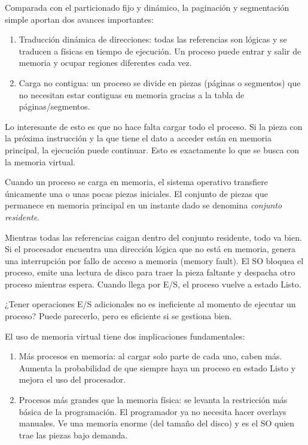 Comparada con el particionado fijo y dinámico, la paginación y segmentación simple aportan dos avances importantes: 
\begin{enumerate}
  \item Traducción dinámica de direcciones: todas las referencias son lógicas y se traducen a físicas en tiempo de ejecución. Un proceso puede entrar y salir de memoria y ocupar regiones diferentes cada vez.
  \item Carga no contigua: un proceso se divide en piezas (páginas o segmentos) que no necesitan estar contiguas en memoria gracias a la tabla de páginas/segmentos.
\end{enumerate}

Lo interesante de esto es que no hace falta cargar todo el proceso. Si la pieza con la próxima instrucción y la que tiene el dato a acceder están en memoria principal, la ejecución puede continuar. Esto es exactamente lo que se busca con la memoria virtual.

Cuando un proceso se carga en memoria, el sistema operativo transfiere únicamente una o unas pocas piezas iniciales. El conjunto de piezas que permanece en memoria principal en un instante dado se denomina \emph{conjunto residente}.

Mientras todas las referencias caigan dentro del conjunto residente, todo va bien. Si el procesador encuentra una dirección lógica que no está en memoria, genera una interrupción por fallo de acceso a memoria (memory fault). El SO bloquea el proceso, emite una lectura de disco para traer la pieza faltante y despacha otro proceso mientras espera. Cuando llega por E/S, el proceso vuelve a estado Listo.

¿Tener operaciones E/S adicionales no es ineficiente al momento de ejecutar un proceso? Puede parecerlo, pero es eficiente si se gestiona bien.

El uso de memoria virtual tiene dos implicaciones fundamentales:
\begin{enumerate}
  \item Más procesos en memoria: al cargar solo parte de cada uno, caben más. Aumenta la probabilidad de que siempre haya un proceso en estado Listo y mejora el uso del procesador.
  \item Procesos más grandes que la memoria física: se levanta la restricción más básica de la programación. El programador ya no necesita hacer overlays manuales. Ve una memoria enorme (del tamaño del disco) y es el SO quien trae las piezas bajo demanda.
\end{enumerate}

